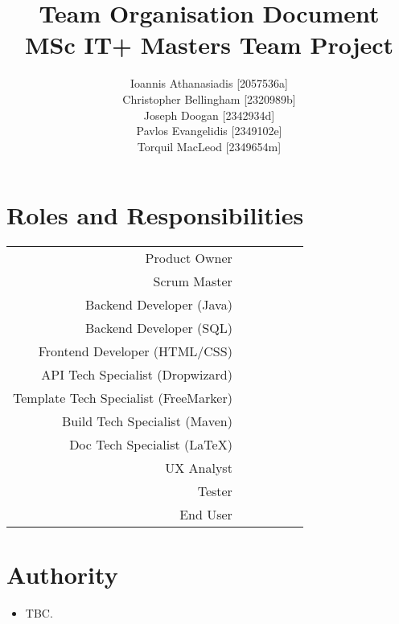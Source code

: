 \documentclass[a4paper, 12pt, titlepage]{article}
\title{\textbf{Team Organisation Document} \\ MSc IT+ Masters Team Project}
\author{
	Ioannis Athanasiadis [2057536a] \\
	Christopher Bellingham [2320989b] \\
	Joseph Doogan [2342934d] \\
	Pavlos Evangelidis [2349102e] \\
	Torquil MacLeod [2349654m]
}
\newcommand*\rot{\rotatebox{90}}
\begin{document}
	\maketitle

	\section{Roles and Responsibilities}
	\begin{center}
	    \begin{tabular}{r*{5}c}
										& \rot{Ioannis Athanasiadis} & \rot{Christopher Bellingham} & \rot{Joseph Doogan} & \rot{Pavlos Evangelidis} & \rot{Torquil MacLeod} \\
	        \hline
	        Product Owner								&     &     &     &     &     \\
	        Scrum Master								&     &     &     &     &     \\
	        Backend Developer (Java)					&     &     &     &     &     \\
	        Backend Developer (SQL)						&     &     &     &     &     \\
	        Frontend Developer (HTML/CSS)				&     &     &     &     &     \\
			API Tech Specialist (Dropwizard)			&     &     &     &     &     \\
	        Template Tech Specialist (FreeMarker)		&     &     &     &     &     \\
	        Build Tech Specialist (Maven)				&     &     &     &     &     \\
	        Doc Tech Specialist (LaTeX)					&     &     &     &     &     \\
	        UX Analyst									&     &     &     &     &     \\
	        Tester										&     &     &     &     &     \\
	        End User									&     &     &     &     &     \\
	        \hline
	    \end{tabular}
    \end{center}


	\section{Authority}
	\begin{itemize}
		\item TBC.
	\end{itemize}
\end{document}
